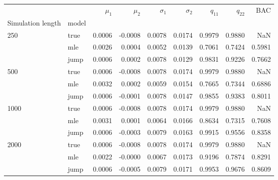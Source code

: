 \begin{tabular}{llrrrrrrr}
\toprule
     &      &  $\mu_1$ &  $\mu_2$ &  $\sigma_1$ &  $\sigma_2$ &  $q_{11}$ &  $q_{22}$ &     BAC \\
Simulation length & model &          &          &             &             &           &           &         \\
\midrule
250  & true &   0.0006 &  -0.0008 &      0.0078 &      0.0174 &    0.9979 &    0.9880 &     NaN \\
     & mle &   0.0026 &   0.0004 &      0.0052 &      0.0139 &    0.7061 &    0.7424 &  0.5981 \\
     & jump &   0.0006 &   0.0002 &      0.0078 &      0.0129 &    0.9831 &    0.9226 &  0.7662 \\
500  & true &   0.0006 &  -0.0008 &      0.0078 &      0.0174 &    0.9979 &    0.9880 &     NaN \\
     & mle &   0.0032 &   0.0002 &      0.0059 &      0.0154 &    0.7665 &    0.7344 &  0.6886 \\
     & jump &   0.0006 &  -0.0001 &      0.0078 &      0.0147 &    0.9855 &    0.9383 &  0.8011 \\
1000 & true &   0.0006 &  -0.0008 &      0.0078 &      0.0174 &    0.9979 &    0.9880 &     NaN \\
     & mle &   0.0031 &   0.0001 &      0.0064 &      0.0166 &    0.8634 &    0.7315 &  0.7608 \\
     & jump &   0.0006 &  -0.0003 &      0.0079 &      0.0163 &    0.9915 &    0.9556 &  0.8358 \\
2000 & true &   0.0006 &  -0.0008 &      0.0078 &      0.0174 &    0.9979 &    0.9880 &     NaN \\
     & mle &   0.0022 &  -0.0000 &      0.0067 &      0.0173 &    0.9196 &    0.7874 &  0.8291 \\
     & jump &   0.0006 &  -0.0005 &      0.0079 &      0.0171 &    0.9953 &    0.9676 &  0.8609 \\
\bottomrule
\end{tabular}
